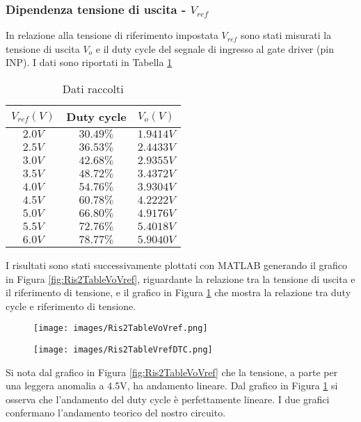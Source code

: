 \subsubsection{Dipendenza tensione di uscita - $V_{ref}$}
In relazione alla tensione di riferimento impostata $V_{ref}$ sono stati misurati la tensione di uscita $V_o$ e il duty cycle del segnale di ingresso al gate driver (pin INP). I dati sono riportati in Tabella \ref{tab:Tab2.3.1}
\begin{table}[H]
    \centering
    \begin{tabular}{|c|c|c|}
        \hline
        $V_{ref}(V)$&Duty cycle&$V_o(V)$\\\hline\hline
        $2.0V$&$30.49\%$&$1.9414V$\\\hline
        $2.5V$&$36.53\%$&$2.4433V$\\\hline
        $3.0V$&$42.68\%$&$2.9355V$\\\hline
        $3.5V$&$48.72\%$&$3.4372V$\\\hline
        $4.0V$&$54.76\%$&$3.9304V$\\\hline
        $4.5V$&$60.78\%$&$4.2222V$\\\hline
        $5.0V$&$66.80\%$&$4.9176V$\\\hline
        $5.5V$&$72.76\%$&$5.4018V$\\\hline
        $6.0V$&$78.77\%$&$5.9040V$\\\hline
    \end{tabular}
    \caption{Dati raccolti}
    \label{tab:Tab2.3.1}
\end{table}
I risultati sono stati successivamente plottati con MATLAB generando il  grafico in Figura \ref{fig:Ris2TableVoVref}, riguardante la relazione tra la tensione di uscita e il riferimento di tensione, e il grafico in Figura \ref{fig:Ris2TableVrefDTC} che mostra la relazione tra duty cycle e riferimento di tensione.
\begin{figure}[H]
    \centering
    \begin{minipage}{.5\linewidth}
        \centering
        \texttt{[image: images/Ris2TableVoVref.png]}
        \caption{}
        \label{fig:Ris2TableVoVref}
    \end{minipage}%
    \begin{minipage}{.5\linewidth}
        \centering
        \texttt{[image: images/Ris2TableVrefDTC.png]}
        \caption{}
        \label{fig:Ris2TableVrefDTC}
    \end{minipage}
\end{figure}
Si nota dal grafico in Figura \ref{fig:Ris2TableVoVref} che la tensione, a parte per una leggera anomalia a 4.5V, ha andamento lineare. Dal grafico in Figura \ref{fig:Ris2TableVrefDTC} si osserva che l'andamento del duty cycle è perfettamente lineare. I due grafici confermano l'andamento teorico del nostro circuito.